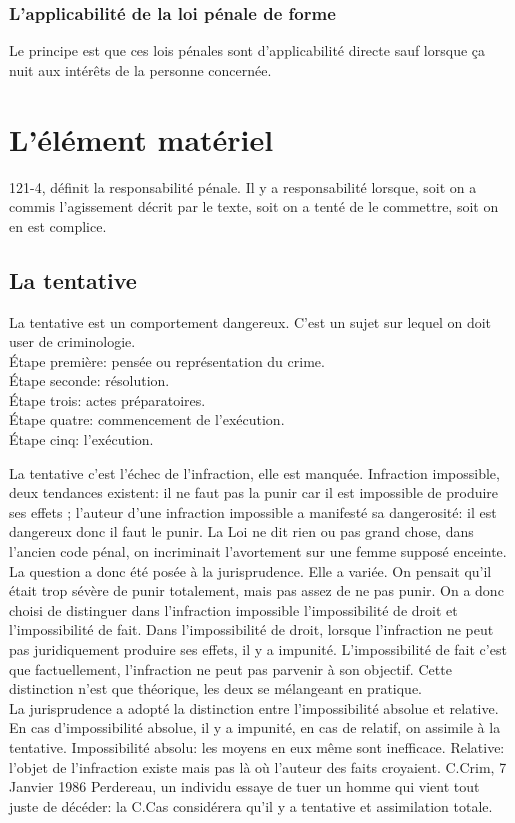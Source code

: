 \documentclass[10pt, a4paper, openany]{book}
\begin{document}
\subsection{L'applicabilité de la loi pénale de forme}

Le principe est que ces lois pénales sont d'applicabilité directe sauf lorsque ça nuit aux intérêts de la personne concernée. 

\chapter{L'élément matériel}

121-4, définit la responsabilité pénale. Il y a responsabilité lorsque, soit on a commis l'agissement décrit par le texte, soit on a tenté de le commettre, soit on en est complice. 

\section{La tentative}

La tentative est un comportement dangereux. C'est un sujet sur lequel on doit user de criminologie. \\
Étape première: pensée ou représentation du crime. \\
Étape seconde: résolution. \\
Étape trois: actes préparatoires. \\
Étape quatre: commencement de l'exécution. \\
Étape cinq: l'exécution. 


La tentative c'est l'échec de l'infraction, elle est manquée. Infraction impossible, deux tendances existent: il ne faut pas la punir car il est impossible de produire ses effets ; l'auteur d'une infraction impossible a manifesté sa dangerosité: il est dangereux donc il faut le punir. La Loi ne dit rien ou pas grand chose, dans l'ancien code pénal, on incriminait l'avortement sur une femme supposé enceinte. \\
La question a donc été posée à la jurisprudence. Elle a variée. On pensait qu'il était trop sévère de punir totalement, mais pas assez de ne pas punir. On a donc choisi de distinguer dans l'infraction impossible l'impossibilité de droit et l'impossibilité de fait. Dans l'impossibilité de droit, lorsque l'infraction ne peut pas juridiquement produire ses effets, il y a impunité. L'impossibilité de fait c'est que factuellement, l'infraction ne peut pas parvenir à son objectif. Cette distinction n'est que théorique, les deux se mélangeant en pratique. \\
La jurisprudence a adopté la distinction entre l'impossibilité absolue et relative. En cas d'impossibilité absolue, il y a  impunité, en cas de relatif, on assimile à la tentative. Impossibilité absolu: les moyens en eux même sont inefficace. Relative: l'objet de l'infraction existe mais pas là où l'auteur des faits croyaient. C.Crim, 7 Janvier 1986 Perdereau, un individu essaye de tuer un homme qui vient tout juste de décéder: la C.Cas considérera qu'il y a tentative et assimilation totale. 
\end{document}

